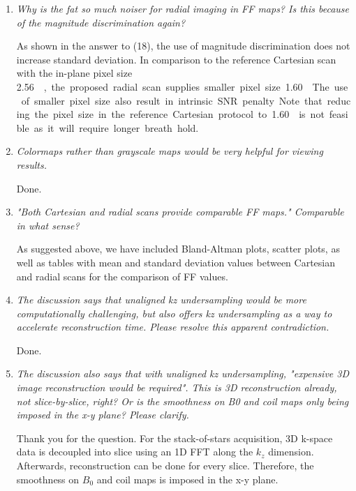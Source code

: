 \documentclass[a4paper,11pt]{report}
\begin{document}
\begin{enumerate}[resume]
	\item \textit{Why is the fat so much noiser for radial imaging in FF maps? Is this because of the magnitude discrimination again?}

\hspace{1em} As shown in the answer to (18), 
the use of magnitude discrimination does not increase standard deviation. 
In comparison to the reference Cartesian scan with the in-plane pixel size \SI{2.56}{\mm\square}, 
the proposed radial scan supplies smaller pixel size \SI{1.60}{\mm\square}. 
The use of smaller pixel size also result in intrinsic SNR penalty. 
Note that reducing the pixel size in the reference Cartesian protocol to \SI{1.60}{\mm\square} 
is not feasible as it will require longer breath hold.

	\item \textit{Colormaps rather than grayscale maps would be very helpful for viewing results.}

\hspace{1em} Done.

	\item \textit{"Both Cartesian and radial scans provide comparable FF maps." Comparable in what sense?}

\hspace{1em} As suggested above, we have included Bland-Altman plots, scatter plots, as well as tables with mean and standard deviation values between Cartesian and radial scans for the comparison of FF values.

	\item \textit{The discussion says that unaligned kz undersampling would be more computationally challenging, but also offers kz undersampling as a way to accelerate reconstruction time. Please resolve this apparent contradiction.}

\hspace{1em} Done.

	\item \textit{The discussion also says that with unaligned kz undersampling, "expensive 3D image reconstruction would be required". This is 3D reconstruction already, not slice-by-slice, right? Or is the smoothness on B0 and coil maps only being imposed in the x-y plane? Please clarify.}

\hspace{1em} Thank you for the question. For the stack-of-stars acquisition, 
3D k-space data is decoupled into slice using an 1D FFT along the $k_z$ dimension. 
Afterwards, reconstruction can be done for every slice. 
Therefore, the smoothness on $B_0$ and coil maps is imposed in the x-y plane.


\end{enumerate}
\end{document}
